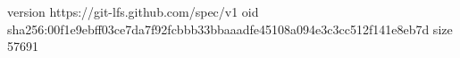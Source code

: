 version https://git-lfs.github.com/spec/v1
oid sha256:00f1e9ebff03ce7da7f92fcbbb33bbaaadfe45108a094e3c3cc512f141e8eb7d
size 57691
